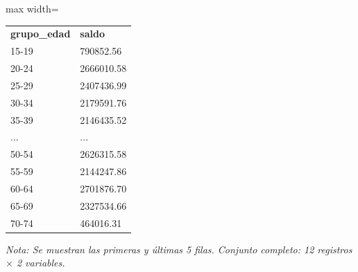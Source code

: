 

\begin{table}[htbp]

\centering

\begin{adjustbox}{max width=\textwidth}

\begin{tabular}{ll}

\rowcolor{ThemeBackground}
\rule{0pt}{0.45cm}
\textcolor{ThemeGold}{\bfseries grupo\_edad} & \textcolor{ThemeGold}{\bfseries saldo} \\

15-19 & 790852.56 \\
20-24 & 2666010.58 \\
25-29 & 2407436.99 \\
30-34 & 2179591.76 \\
35-39 & 2146435.52 \\
... & ... \\
50-54 & 2626315.58 \\
55-59 & 2144247.86 \\
60-64 & 2701876.70 \\
65-69 & 2327534.66 \\
70-74 & 464016.31 \\
\bottomrule
\end{tabular}

\end{adjustbox}

\vspace{0.15cm}
{\raggedright\sffamily\footnotesize\color{ThemeMuted}
\textit{Nota: Se muestran las primeras y últimas 5 filas. Conjunto completo: 12 registros $\times$ 2 variables.}}

\end{table}
